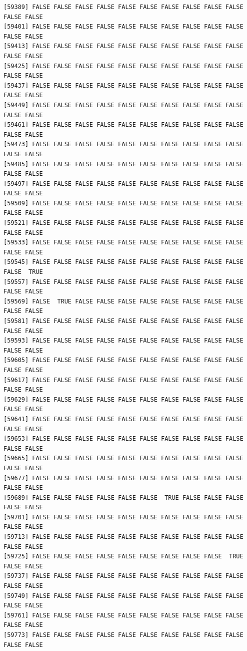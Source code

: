 \documentclass[
  a4paper,
  DIV=11,
  numbers=noendperiod]{scrartcl}
\begin{document}
\begin{verbatim}
[59389] FALSE FALSE FALSE FALSE FALSE FALSE FALSE FALSE FALSE FALSE FALSE FALSE
[59401] FALSE FALSE FALSE FALSE FALSE FALSE FALSE FALSE FALSE FALSE FALSE FALSE
[59413] FALSE FALSE FALSE FALSE FALSE FALSE FALSE FALSE FALSE FALSE FALSE FALSE
[59425] FALSE FALSE FALSE FALSE FALSE FALSE FALSE FALSE FALSE FALSE FALSE FALSE
[59437] FALSE FALSE FALSE FALSE FALSE FALSE FALSE FALSE FALSE FALSE FALSE FALSE
[59449] FALSE FALSE FALSE FALSE FALSE FALSE FALSE FALSE FALSE FALSE FALSE FALSE
[59461] FALSE FALSE FALSE FALSE FALSE FALSE FALSE FALSE FALSE FALSE FALSE FALSE
[59473] FALSE FALSE FALSE FALSE FALSE FALSE FALSE FALSE FALSE FALSE FALSE FALSE
[59485] FALSE FALSE FALSE FALSE FALSE FALSE FALSE FALSE FALSE FALSE FALSE FALSE
[59497] FALSE FALSE FALSE FALSE FALSE FALSE FALSE FALSE FALSE FALSE FALSE FALSE
[59509] FALSE FALSE FALSE FALSE FALSE FALSE FALSE FALSE FALSE FALSE FALSE FALSE
[59521] FALSE FALSE FALSE FALSE FALSE FALSE FALSE FALSE FALSE FALSE FALSE FALSE
[59533] FALSE FALSE FALSE FALSE FALSE FALSE FALSE FALSE FALSE FALSE FALSE FALSE
[59545] FALSE FALSE FALSE FALSE FALSE FALSE FALSE FALSE FALSE FALSE FALSE  TRUE
[59557] FALSE FALSE FALSE FALSE FALSE FALSE FALSE FALSE FALSE FALSE FALSE FALSE
[59569] FALSE  TRUE FALSE FALSE FALSE FALSE FALSE FALSE FALSE FALSE FALSE FALSE
[59581] FALSE FALSE FALSE FALSE FALSE FALSE FALSE FALSE FALSE FALSE FALSE FALSE
[59593] FALSE FALSE FALSE FALSE FALSE FALSE FALSE FALSE FALSE FALSE FALSE FALSE
[59605] FALSE FALSE FALSE FALSE FALSE FALSE FALSE FALSE FALSE FALSE FALSE FALSE
[59617] FALSE FALSE FALSE FALSE FALSE FALSE FALSE FALSE FALSE FALSE FALSE FALSE
[59629] FALSE FALSE FALSE FALSE FALSE FALSE FALSE FALSE FALSE FALSE FALSE FALSE
[59641] FALSE FALSE FALSE FALSE FALSE FALSE FALSE FALSE FALSE FALSE FALSE FALSE
[59653] FALSE FALSE FALSE FALSE FALSE FALSE FALSE FALSE FALSE FALSE FALSE FALSE
[59665] FALSE FALSE FALSE FALSE FALSE FALSE FALSE FALSE FALSE FALSE FALSE FALSE
[59677] FALSE FALSE FALSE FALSE FALSE FALSE FALSE FALSE FALSE FALSE FALSE FALSE
[59689] FALSE FALSE FALSE FALSE FALSE FALSE  TRUE FALSE FALSE FALSE FALSE FALSE
[59701] FALSE FALSE FALSE FALSE FALSE FALSE FALSE FALSE FALSE FALSE FALSE FALSE
[59713] FALSE FALSE FALSE FALSE FALSE FALSE FALSE FALSE FALSE FALSE FALSE FALSE
[59725] FALSE FALSE FALSE FALSE FALSE FALSE FALSE FALSE FALSE  TRUE FALSE FALSE
[59737] FALSE FALSE FALSE FALSE FALSE FALSE FALSE FALSE FALSE FALSE FALSE FALSE
[59749] FALSE FALSE FALSE FALSE FALSE FALSE FALSE FALSE FALSE FALSE FALSE FALSE
[59761] FALSE FALSE FALSE FALSE FALSE FALSE FALSE FALSE FALSE FALSE FALSE FALSE
[59773] FALSE FALSE FALSE FALSE FALSE FALSE FALSE FALSE FALSE FALSE FALSE FALSE

\end{verbatim}
\end{document}

